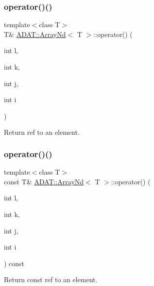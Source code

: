 \subsubsection{\texorpdfstring{operator()()}{operator()()}\hspace{0.1cm}{\footnotesize\ttfamily [21/24]}}
{\footnotesize\ttfamily template$<$class T$>$ \\
T\& \mbox{\hyperlink{classADAT_1_1ArrayNd}{A\+D\+A\+T\+::\+Array\+Nd}}$<$ T $>$\+::operator() (\begin{DoxyParamCaption}\item[{int}]{l,  }\item[{int}]{k,  }\item[{int}]{j,  }\item[{int}]{i }\end{DoxyParamCaption})\hspace{0.3cm}{\ttfamily [inline]}}



Return ref to an element. 

\mbox{\label{classADAT_1_1ArrayNd_aa2f8e4f6fa9a05745538791ba4f70aff}} 
\subsubsection{\texorpdfstring{operator()()}{operator()()}\hspace{0.1cm}{\footnotesize\ttfamily [22/24]}}
{\footnotesize\ttfamily template$<$class T$>$ \\
const T\& \mbox{\hyperlink{classADAT_1_1ArrayNd}{A\+D\+A\+T\+::\+Array\+Nd}}$<$ T $>$\+::operator() (\begin{DoxyParamCaption}\item[{int}]{l,  }\item[{int}]{k,  }\item[{int}]{j,  }\item[{int}]{i }\end{DoxyParamCaption}) const\hspace{0.3cm}{\ttfamily [inline]}}



Return const ref to an element. 

\mbox{\label{classADAT_1_1ArrayNd_aa2f8e4f6fa9a05745538791ba4f70aff}} 
